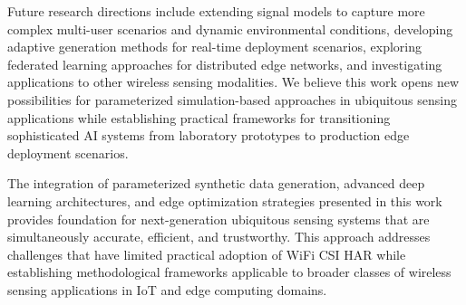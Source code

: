 \documentclass[journal]{IEEEtran}
\begin{document}
Future research directions include extending signal models to capture more complex multi-user scenarios and dynamic environmental conditions, developing adaptive generation methods for real-time deployment scenarios, exploring federated learning approaches for distributed edge networks, and investigating applications to other wireless sensing modalities. We believe this work opens new possibilities for parameterized simulation-based approaches in ubiquitous sensing applications while establishing practical frameworks for transitioning sophisticated AI systems from laboratory prototypes to production edge deployment scenarios.

The integration of parameterized synthetic data generation, advanced deep learning architectures, and edge optimization strategies presented in this work provides foundation for next-generation ubiquitous sensing systems that are simultaneously accurate, efficient, and trustworthy. This approach addresses challenges that have limited practical adoption of WiFi CSI HAR while establishing methodological frameworks applicable to broader classes of wireless sensing applications in IoT and edge computing domains.

\end{document}
